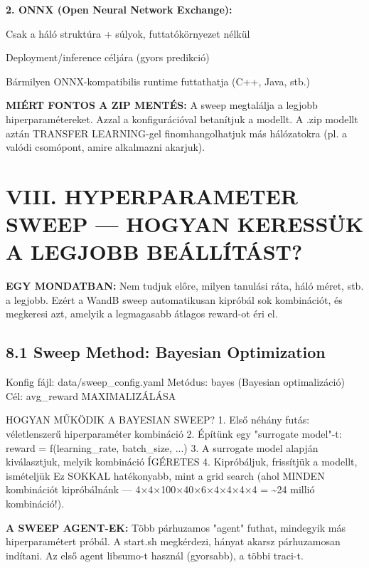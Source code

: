 \documentclass[11pt,a4paper]{article}
\begin{document}
\textbf{2. ONNX (Open Neural Network Exchange):}
\par\noindent\hspace*{1em}\textbullet{} Csak a háló struktúra + súlyok, futtatókörnyezet nélkül
\par\noindent\hspace*{1em}\textbullet{} Deployment/inference céljára (gyors predikció)
\par\noindent\hspace*{1em}\textbullet{} Bármilyen ONNX-kompatibilis runtime futtathatja (C++, Java, stb.)

\textbf{MIÉRT FONTOS A ZIP MENTÉS:}
A sweep megtalálja a legjobb hiperparamétereket. Azzal a
konfigurációval betanítjuk a modellt. A .zip modellt aztán
TRANSFER LEARNING-gel finomhangolhatjuk más hálózatokra
(pl. a valódi csomópont, amire alkalmazni akarjuk).


\section*{VIII. HYPERPARAMETER SWEEP — HOGYAN KERESSÜK A LEGJOBB BEÁLLÍTÁST?}

\textbf{EGY MONDATBAN:}
Nem tudjuk előre, milyen tanulási ráta, háló méret, stb. a legjobb.
Ezért a WandB sweep automatikusan kipróbál sok kombinációt, és
megkeresi azt, amelyik a legmagasabb átlagos reward-ot éri el.

\subsection*{8.1 Sweep Method: Bayesian Optimization}
Konfig fájl: data/sweep\_config.yaml
Metódus: bayes (Bayesian optimalizáció)
Cél: avg\_reward MAXIMALIZÁLÁSA

HOGYAN MŰKÖDIK A BAYESIAN SWEEP?
1. Első néhány futás: véletlenszerű hiperparaméter kombináció
2. Építünk egy "surrogate model"-t: reward = f(learning\_rate, batch\_size, ...)
3. A surrogate model alapján kiválasztjuk, melyik kombináció ÍGÉRETES
4. Kipróbáljuk, frissítjük a modellt, ismételjük
Ez SOKKAL hatékonyabb, mint a grid search (ahol MINDEN kombinációt
kipróbálnánk — 4×4×100×40×6×4×4×4×4 = \textasciitilde{}24 millió kombináció!).

\textbf{A SWEEP AGENT-EK:}
Több párhuzamos "agent" futhat, mindegyik más hiperparamétert próbál.
A start.sh megkérdezi, hányat akarsz párhuzamosan indítani.
Az első agent libsumo-t használ (gyorsabb), a többi traci-t.
\end{document}
